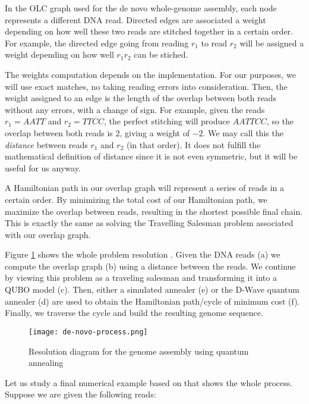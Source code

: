 In the OLC graph used for the de novo whole-genome assembly, each node represents a different DNA read. Directed edges are associated a weight depending on how well these two reads are stitched together in a certain order. For example, the directed edge going from reading $r_1$ to read $r_2$ will be assigned a weight depending on how well $r_1r_2$ can be stiched.

The weights computation depends on the implementation. For our purposes, we will use exact matches, no taking reading errors into consideration. Then, the weight assigned to an edge is the length of the overlap between both reads without any errors, with a change of sign. For example, given the reads $r_1 = AATT$ and $r_2 = TTCC$, the perfect stitching will produce $AATTCC$, so the overlap between both reads is $2$, giving a weight of $-2$. We may call this the \emph{distance} between reads $r_1$ and $r_2$ (in that order). It does not fulfill the mathematical definition of distance since it is not even symmetric, but it will be useful for us anyway.

A Hamiltonian path in our overlap graph will represent a series of reads in a certain order. By minimizing the total cost of our Hamiltonian path, we maximize the overlap between reads, resulting in the shortest possible final chain. This is exactly the same as solving the Travelling Salesman problem associated with our overlap graph.

Figure \ref{de-novo-process} shows the whole problem resolution \cite{Boev2020}. Given the DNA reads (a) we compute the overlap graph (b) using a distance between the reads. We continue by viewing this problem as a traveling salesman and transforming it into a QUBO model (c). Then, either a simulated annealer (e) or the D-Wave quantum annealer (d) are used to obtain the Hamiltonian path/cycle of minimum cost (f). Finally, we traverse the cycle and build the resulting genome sequence.

\begin{figure}[H]
	\texttt{[image: de-novo-process.png]}
	\centering
	\caption{Resolution diagram for the genome assembly using quantum annealing \cite{Boev2020}}
	\label{de-novo-process}
\end{figure}




Let us study a final numerical example based on \cite{Sarkar2020} that shows the whole process. Suppose we are given the following reads:

